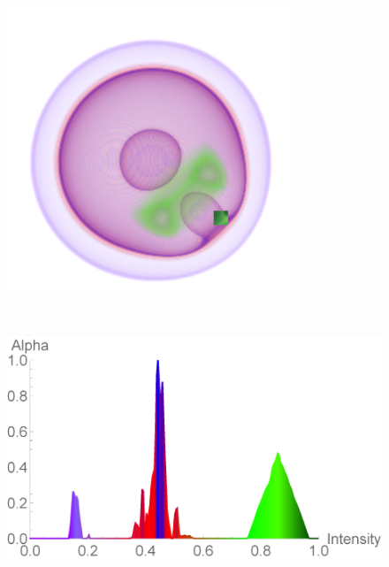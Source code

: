 \documentclass[twoside,twocolumn,10pt]{article}
\begin{document}
\begin{figure}
	\centering
	\begin{minipage}{.1\textwidth}
		\centering
		\includegraphics[width=1\linewidth]{nucleon_blue_crop}
		\label{fig:nucleon_2_blue}
	\end{minipage}~
	\begin{minipage}{.13\textwidth}
		\centering
		\includegraphics[width=1\linewidth]{tf_nucleon_2_blue}
		\label{fig:tf_nucleon_2_blue}
	\end{minipage}~

\end{figure}
\end{document}
